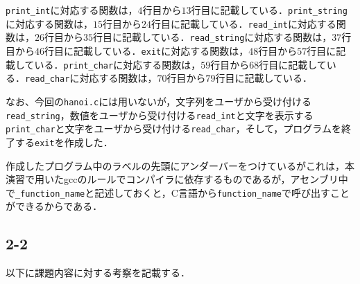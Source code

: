 \documentclass[a4j,11pt]{jarticle}
\begin{document}
\verb|print_int|に対応する関数は，$4$行目から$13$行目に記載している．\verb|print_string|に対応する関数は，$15$行目から$24$行目に記載している．\verb|read_int|に対応する関数は，$26$行目から$35$行目に記載している．\verb|read_string|に対応する関数は，$37$行目から$46$行目に記載している．\verb|exit|に対応する関数は，$48$行目から$57$行目に記載している．\verb|print_char|に対応する関数は，$59$行目から$68$行目に記載している．\verb|read_char|に対応する関数は，$70$行目から$79$行目に記載している．

なお、今回の\verb|hanoi.c|には用いないが，文字列をユーザから受け付ける\verb|read_string|，数値をユーザから受け付ける\verb|read_int|と文字を表示する\verb|print_char|と文字をユーザから受け付ける\verb|read_char|，そして，プログラムを終了する\verb|exit|を作成した．
  
作成したプログラム中のラベルの先頭にアンダーバーをつけているがこれは，本演習で用いたgccのルールでコンパイラに依存するものであるが，アセンブリ中で\verb|_function_name|と記述しておくと，C言語から\verb|function_name|で呼び出すことができるからである．


 \subsection{2-2}
以下に課題内容に対する考察を記載する．
\end{document}
